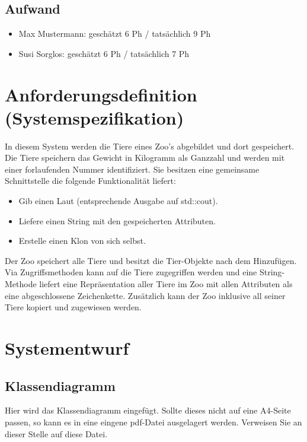 \documentclass[12pt,naustrian,a4widepaper]{scrartcl}
\begin{document}
\subsection{Aufwand}
	
	\begin{itemize}
		\item Max Mustermann: geschätzt 6 Ph / tatsächlich 9 Ph
		\item Susi Sorglos: geschätzt 6 Ph / tatsächlich 7 Ph
	\end{itemize}

\clearpage
\section{Anforderungsdefinition (Systemspezifikation)}

In diesem System werden die Tiere eines Zoo's abgebildet und dort gespeichert. Die Tiere speichern das Gewicht in Kilogramm als Ganzzahl und werden mit einer forlaufenden Nummer identifiziert. Sie besitzen eine gemeinsame Schnittstelle die folgende Funktionalität liefert:
\begin{itemize}
	\item Gib einen Laut (entsprechende Ausgabe auf std::cout).
	\item Liefere einen String mit den gespeicherten Attributen.
	\item Erstelle einen Klon von sich selbst.
\end{itemize}

Der Zoo speichert alle Tiere und besitzt die Tier-Objekte nach dem Hinzufügen. Via Zugriffsmethoden kann auf die Tiere zugegriffen werden und eine String-Methode liefert eine Repräsentation aller Tiere im Zoo mit allen Attributen als eine abgeschlossene Zeichenkette. Zusätzlich kann der Zoo inklusive all seiner Tiere kopiert und zugewiesen werden.

\clearpage
\section{Systementwurf}

\subsection{Klassendiagramm}
\color{blue}
Hier wird das Klassendiagramm eingefügt. Sollte dieses nicht auf eine A4-Seite passen, so kann es in eine eingene pdf-Datei ausgelagert werden.
Verweisen Sie an dieser Stelle auf diese Datei.
\color{black}
\end{document}
